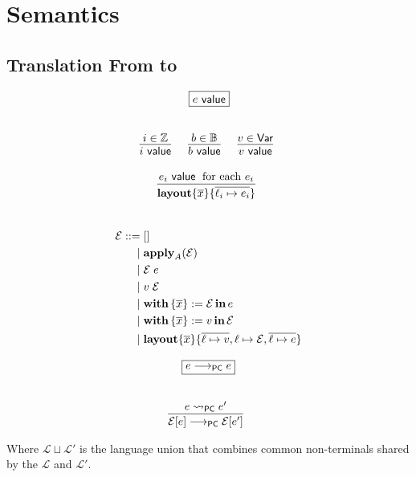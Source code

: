 \section{Semantics}

\subsection{Translation From \Pika{} to \PikaCore}

\[
  \begin{array}{c}
    \fbox{$e ~\val$}
    \fboxNewlines
    \labinfer{i ~\val}{i \in \mathbb{Z}}
    ~~~
    \labinfer{b ~\val}{b \in \mathbb{B}}
    ~~~
    \labinfer{v ~\val}{v \in \Var}
    \\\\
    \labinfer{\sslmath{\overline{x}}{\overline{\ell_i \mapsto e_i}}}
      {e_i ~\val \;\textrm{ for each $e_i$}}
  \end{array}
\]
\\

\[
  \begin{aligned}
  \mathcal{E}
    ::=\; &[]\\
    \mid\; &\textbf{apply}_A(\mathcal{E})\\
    \mid\; &\mathcal{E}\; e\\
    \mid\; &v\; \mathcal{E}\\
    \mid\; &\textbf{with}\,\{ \overline{x} \} := \mathcal{E}\,\textbf{in}\, e\\
    \mid\; &\textbf{with}\,\{ \overline{x} \} := v\,\textbf{in}\, \mathcal{E}\\
    \mid\; &\textbf{layout}\{ \overline{x} \}\{ \overline{\ell \mapsto v}, \ell \mapsto \mathcal{E}, \overline{\ell \mapsto e} \}
  \end{aligned}
\]

\[
  \begin{array}{c}
    \fbox{$e \pcstep e$}
    \fboxNewlines
    \labinfer{\mathcal{E}[e] \pcstep \mathcal{E}[e']}
      {e \pcNotionStep e'}
  \end{array}
\]

Where $\mathcal{L} \sqcup \mathcal{L}'$ is the language union that combines common non-terminals shared by the $\mathcal{L}$ and $\mathcal{L}'$.

